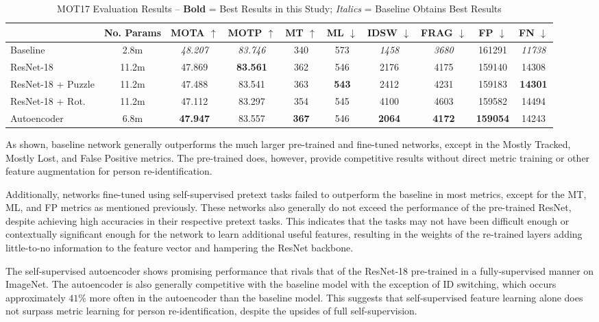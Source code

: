 \documentclass[10pt,twocolumn,letterpaper]{article}
\begin{document}
\begin{table}[t!]
    \centering
    \begin{tabular}{|l|c|c|c|c|c|c|c|c|c|} 
         \hline & No. Params & MOTA $\uparrow$ & MOTP $\uparrow$ & MT $\uparrow$ & ML $\downarrow$ & IDSW $\downarrow$ & FRAG $\downarrow$ & FP $\downarrow$ & FN $\downarrow$  \\ \hline
         Baseline \cite{Wojke2018} & 2.8m & \textit{48.207} & \textit{83.746} & 340 & 573 & \textit{1458} & \textit{3680} & 161291 & \textit{11738}  \\ \hline \hline
         ResNet-18 \cite{Resnet} & 11.2m & 47.869 & \textbf{83.561} & 362 & 546 & 2176 & 4175& 159140& 14308 \\ \hline
         ResNet-18 + Puzzle  & 11.2m & 47.488 & 83.541 & 363 & \textbf{543} & 2412 & 4231 & 159183 & \textbf{14301} \\ \hline
         ResNet-18 + Rot. & 11.2m & 47.112&83.297 &354 &545 &4100 & 4603&159582 &14494 \\ \hline
         Autoencoder & 6.8m & \textbf{47.947} & 83.557&\textbf{367} &546 & \textbf{2064} & \textbf{4172} & \textbf{159054} &14243 \\ \hline
    \end{tabular}
    \caption{MOT17 Evaluation Results -- \textbf{Bold} = Best Results in this Study; \textit{Italics} = Baseline Obtains Best Results}
    \label{tab:results}
\end{table}

As shown, baseline network generally outperforms the much larger pre-trained and fine-tuned networks, except in the Mostly Tracked, Mostly Lost, and False Positive metrics. The pre-trained does, however, provide competitive results without direct metric training or other feature augmentation for person re-identification.

Additionally, networks fine-tuned using self-supervised pretext tasks failed to outperform the baseline in most metrics, except for the MT, ML, and FP metrics as mentioned previously. These networks also generally do not exceed the performance of the pre-trained ResNet, despite achieving high accuracies in their respective pretext tasks. This indicates that the tasks may not have been difficult enough or contextually significant enough for the network to learn additional useful features, resulting in the weights of the re-trained layers adding little-to-no information to the feature vector and hampering the ResNet backbone. 

The self-supervised autoencoder shows promising performance that rivals that of the ResNet-18 pre-trained in a fully-supervised manner on ImageNet. The autoencoder is also generally competitive with the baseline model with the exception of ID switching, which occurs approximately $41\%$ more often in the autoencoder than the baseline model. This suggests that self-supervised feature learning alone does not surpass metric learning for person re-identification, despite the upsides of full self-supervision.
\end{document}
